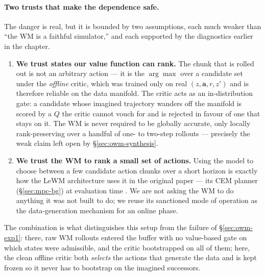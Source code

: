 \paragraph{Two trusts that make the dependence safe.}
The danger is real, but it is bounded by two assumptions, each much
weaker than ``the WM is a faithful simulator,'' and each supported by
the diagnostics earlier in the chapter.
\begin{enumerate}
    \item \textbf{We trust states our value function can rank.} The
    chunk that is rolled out is not an arbitrary action --- it is the
    $\arg\max$ over a candidate set under the \emph{offline} critic,
    which was trained only on real $(z,\mathbf{a},r,z')$ and is
    therefore reliable on the data manifold. The critic acts as an
    in-distribution gate: a candidate whose imagined trajectory wanders
    off the manifold is scored by a $Q$ the critic cannot vouch for and
    is rejected in favour of one that stays on it. The WM is never
    required to be globally accurate, only locally rank-preserving over
    a handful of one- to two-step rollouts --- precisely the weak claim
    left open by \S\ref{sec:owm-synthesis}.
    \item \textbf{We trust the WM to rank a small set of actions.} Using
    the model to choose between a few candidate action chunks over a
    short horizon is exactly how the LeWM architecture uses it in the
    original paper --- its CEM planner (\S\ref{sec:mpc-bg}) at
    evaluation time \cite{maes2026leworldmodelstableendtoendjointembedding}.
    We are not asking the WM to do anything it was not built to do; we
    reuse its sanctioned mode of operation as the data-generation
    mechanism for an online phase.
\end{enumerate}
The combination is what distinguishes this setup from the failure of
\S\ref{sec:owm-exp1}: there, raw WM rollouts entered the buffer with no
value-based gate on which states were admissible, and the critic
bootstrapped on all of them; here, the clean offline critic both
\emph{selects} the actions that generate the data and is kept frozen so
it never has to bootstrap on the imagined successors.

